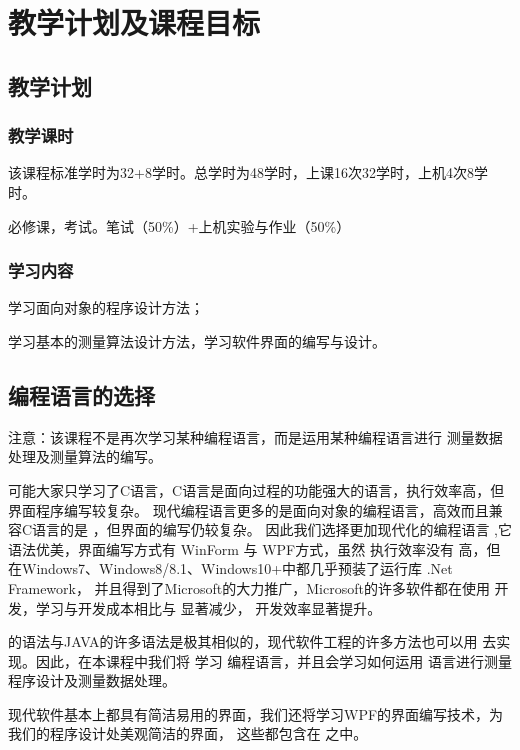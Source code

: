 

\chapter{教学计划及课程目标}

\section*{教学计划}

\subsection*{教学课时}
该课程标准学时为32+8学时。总学时为48学时，上课16次32学时，上机4次8学时。

必修课，考试。笔试（50\%）+上机实验与作业（50\%）

\subsection*{学习内容}

学习面向对象的程序设计方法；

学习基本的测量算法设计方法，学习软件界面的编写与设计。

\section*{编程语言的选择}

注意：该课程不是再次学习某种编程语言，而是运用某种编程语言进行
测量数据处理及测量算法的编写。

可能大家只学习了C语言，C语言是面向过程的功能强大的语言，执行效率高，但界面程序编写较复杂。
现代编程语言更多的是面向对象的编程语言，高效而且兼容C语言的是 \cpp ，但界面的编写仍较复杂。
因此我们选择更加现代化的编程语言 \cs ,它语法优美，界面编写方式有 WinForm 与 WPF方式，虽然
执行效率没有 \cpp 高，但在Windows7、Windows8/8.1、Windows10+中都几乎预装了运行库 .Net Framework，
并且得到了Microsoft的大力推广，Microsoft的许多软件都在使用 \cs 开发，学习与开发成本相比与 \cpp 显著减少，
开发效率显著提升。

\cs 的语法与JAVA的许多语法是极其相似的，现代软件工程的许多方法也可以用 \cs 去实现。因此，在本课程中我们将
学习 \cs 编程语言，并且会学习如何运用 \cs 语言进行测量程序设计及测量数据处理。

现代软件基本上都具有简洁易用的界面，我们还将学习WPF的界面编写技术，为我们的程序设计处美观简洁的界面，
这些都包含在 \cs 之中。

